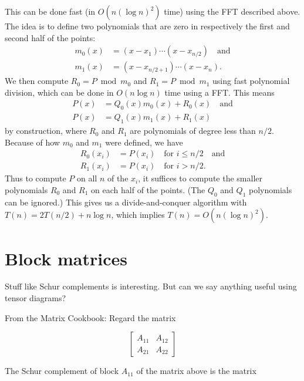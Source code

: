 This can be done fast (in $O(n(\log n)^2)$ time) using the FFT described above.
The idea is to define two polynomials that are zero in respectively the first and second half of the points:
\begin{align*}
   m_0(x)&=(x-x_1)\cdots(x-x_{n/2}) \quad\text{and}\\
   m_1(x)&=(x-x_{n/2+1})\cdots(x-x_{n}).
\end{align*}
We then compute $R_0 = P \bmod m_0$ and $R_1 = P \bmod m_1$ using fast polynomial division, which can be done in $O(n\log n)$ time using a FFT.
This means
\begin{align*}
   P(x) &= Q_0(x)m_0(x) + R_0(x) \quad\text{and}\\
   P(x) &= Q_1(x)m_1(x) + R_1(x)
\end{align*}
by construction, where $R_0$ and $R_1$ are polynomials of degree less than $n/2$.
Because of how $m_0$ and $m_1$ were defined, we have
\begin{align*}
R_0(x_i) &= P(x_i) \quad\text{for } i \le n/2 \quad\text{and}\\
R_1(x_i) &= P(x_i) \quad\text{for } i > n/2.
\end{align*}
Thus to compute $P$ on all $n$ of the $x_i$, it suffices to compute the smaller polynomials $R_0$ and $R_1$ on each half of the points.
(The $Q_0$ and $Q_1$ polynomials can be ignored.)
This gives us a divide-and-conquer algorithm with $T(n) = 2T(n/2) + n\log n$, which implies $T(n)=O(n(\log n)^2)$.



\section{Block matrices}
Stuff like Schur complements is interesting.
But can we say anything useful using tensor diagrams?

From the Matrix Cookbook:
Regard the matrix

\[
   \left[ \begin{array}{c|c} A_{11} & A_{12} \\ \hline A_{21} & A_{22} \end{array} \right]
\]

The Schur complement of block $A_{11}$ of the matrix above is the matrix

